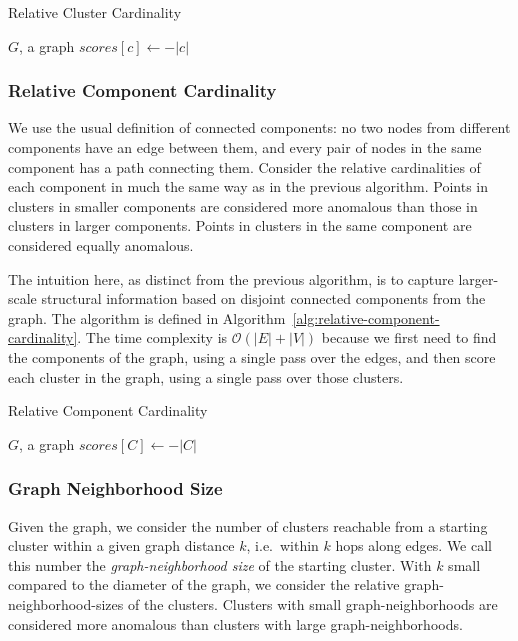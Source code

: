 \begin{algorithm}[h]
    \caption{Relative Cluster Cardinality}
    \label{alg:relative-cluster-cardinality}
\begin{algorithmic}[1]
    \REQUIRE $G$, a graph
    \STATE $scores[c] \gets -|c|$
    \ENDFOR
\end{algorithmic}
\end{algorithm}


\subsubsection{Relative Component Cardinality}
\label{subsubsec:methods:individual-algorithms:relative-component-cardinality}
We use the usual definition of connected components:
no two nodes from different components have an edge between them, and
every pair of nodes in the same component has a path connecting them.
Consider the relative cardinalities of each component in much the same way as in the previous algorithm.
Points in clusters in smaller components are considered more anomalous than those in clusters in larger components.
Points in clusters in the same component are considered equally anomalous.

The intuition here, as distinct from the previous algorithm, is to capture larger-scale structural information based on disjoint connected components from the graph.
The algorithm is defined in Algorithm~\ref{alg:relative-component-cardinality}.
The time complexity is $\mathcal{O}(|E| + |V|)$ because we first need to find the components of the graph, using a single pass over the edges, and then score each cluster in the graph, using a single pass over those clusters.

\begin{algorithm}[h]
    \caption{Relative Component Cardinality}
    \label{alg:relative-component-cardinality}
\begin{algorithmic}[1]
    \REQUIRE $G$, a graph
        \STATE $scores[C] \gets -|C|$
    \ENDFOR
\end{algorithmic}
\end{algorithm}


\subsubsection{Graph Neighborhood Size}
\label{subsubsec:methods:individual-algorithms:graph-neighborhood-size}
Given the graph, we consider the number of clusters reachable from a starting cluster within a given graph distance $k$, i.e.\ within $k$ hops along edges.
We call this number the \textit{graph-neighborhood size} of the starting cluster.
With $k$ small compared to the diameter of the graph, we consider the relative graph-neighborhood-sizes of the clusters.
Clusters with small graph-neighborhoods are considered more anomalous than clusters with large graph-neighborhoods.

